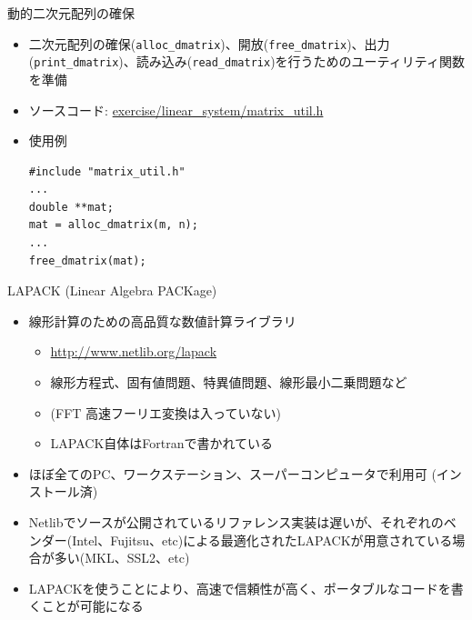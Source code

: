 \documentclass[dvipdfmx]{beamer}
\begin{document}
\begin{frame}[t,fragile]{動的二次元配列の確保}
  \begin{itemize}
    \setlength{\itemsep}{1em}
  \item 二次元配列の確保({\tt alloc\_dmatrix})、開放({\tt free\_dmatrix})、出力({\tt print\_dmatrix})、読み込み({\tt read\_dmatrix})を行うためのユーティリティ関数を準備
  \item ソースコード: \href{https://github.com/todo-group/computer-experiments/blob/master/linear_system/matrix_util.h}{exercise/linear\_system/matrix\_util.h}
  \item 使用例
\begin{lstlisting}
#include "matrix_util.h"
...
double **mat;
mat = alloc_dmatrix(m, n);
...
free_dmatrix(mat);
\end{lstlisting}
  \end{itemize}
\end{frame}

\begin{frame}[t,fragile]{LAPACK (Linear Algebra PACKage)}
  \begin{itemize}
  \item 線形計算のための高品質な数値計算ライブラリ
    \begin{itemize}
    \item \url{http://www.netlib.org/lapack}
    \item 線形方程式、固有値問題、特異値問題、線形最小二乗問題など
    \item (FFT 高速フーリエ変換は入っていない)
    \item LAPACK自体はFortranで書かれている
    \end{itemize}
  \item ほぼ全てのPC、ワークステーション、スーパーコンピュータで利用可 (インストール済)
  \item Netlibでソースが公開されているリファレンス実装は遅いが、それぞれのベンダー(Intel、Fujitsu、etc)による最適化されたLAPACKが用意されている場合が多い(MKL、SSL2、etc)
  \item LAPACKを使うことにより、高速で信頼性が高く、ポータブルなコードを書くことが可能になる
  \end{itemize}
\end{frame}
\end{document}

